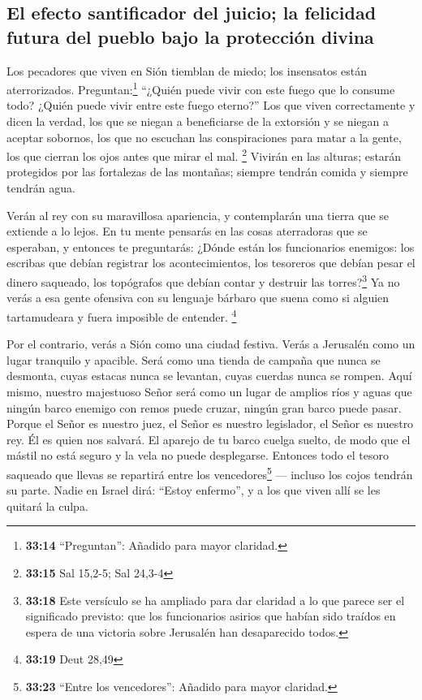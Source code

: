 \hypertarget{el-efecto-santificador-del-juicio-la-felicidad-futura-del-pueblo-bajo-la-protecciuxf3n-divina}{%
\subsection{El efecto santificador del juicio; la felicidad futura del
pueblo bajo la protección
divina}\label{el-efecto-santificador-del-juicio-la-felicidad-futura-del-pueblo-bajo-la-protecciuxf3n-divina}}

 Los pecadores que viven en Sión tiemblan de miedo; los
insensatos están aterrorizados. Preguntan:\footnote{\textbf{33:14}
  ``Preguntan'': Añadido para mayor claridad.} ``¿Quién puede vivir con
este fuego que lo consume todo? ¿Quién puede vivir entre este fuego
eterno?''  Los que viven correctamente y dicen la verdad,
los que se niegan a beneficiarse de la extorsión y se niegan a aceptar
sobornos, los que no escuchan las conspiraciones para matar a la gente,
los que cierran los ojos antes que mirar el mal. \footnote{\textbf{33:15}
  Sal 15,2-5; Sal 24,3-4}  Vivirán en las alturas;
estarán protegidos por las fortalezas de las montañas; siempre tendrán
comida y siempre tendrán agua.

 Verán al rey con su maravillosa apariencia, y
contemplarán una tierra que se extiende a lo lejos.  En
tu mente pensarás en las cosas aterradoras que se esperaban, y entonces
te preguntarás: ¿Dónde están los funcionarios enemigos: los escribas que
debían registrar los acontecimientos, los tesoreros que debían pesar el
dinero saqueado, los topógrafos que debían contar y destruir las
torres?\footnote{\textbf{33:18} Este versículo se ha ampliado para dar
  claridad a lo que parece ser el significado previsto: que los
  funcionarios asirios que habían sido traídos en espera de una victoria
  sobre Jerusalén han desaparecido todos.}  Ya no verás a
esa gente ofensiva con su lenguaje bárbaro que suena como si alguien
tartamudeara y fuera imposible de entender. \footnote{\textbf{33:19}
  Deut 28,49}

 Por el contrario, verás a Sión como una ciudad festiva.
Verás a Jerusalén como un lugar tranquilo y apacible. Será como una
tienda de campaña que nunca se desmonta, cuyas estacas nunca se
levantan, cuyas cuerdas nunca se rompen.  Aquí mismo,
nuestro majestuoso Señor será como un lugar de amplios ríos y aguas que
ningún barco enemigo con remos puede cruzar, ningún gran barco puede
pasar.  Porque el Señor es nuestro juez, el Señor es
nuestro legislador, el Señor es nuestro rey. Él es quien nos salvará.
 El aparejo de tu barco cuelga suelto, de modo que el
mástil no está seguro y la vela no puede desplegarse. Entonces todo el
tesoro saqueado que llevas se repartirá entre los vencedores\footnote{\textbf{33:23}
  ``Entre los vencedores'': Añadido para mayor claridad.} --- incluso
los cojos tendrán su parte.  Nadie en Israel dirá:
``Estoy enfermo'', y a los que viven allí se les quitará la culpa.

